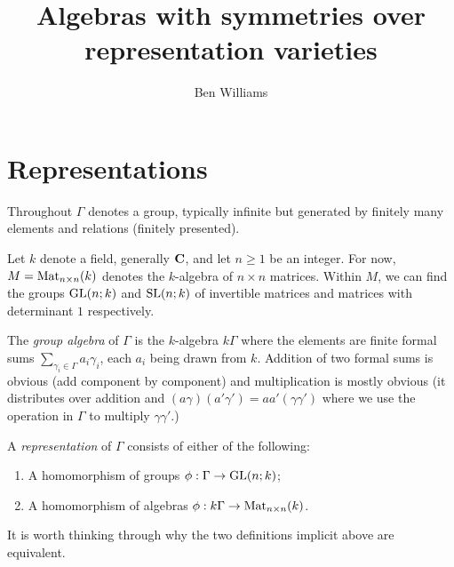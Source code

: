 \documentclass[11pt, oneside, usenames, dvipsnames, svgnames, table, draft]{amsart}
\begin{document}
   

\title{Algebras with symmetries over representation varieties}
\author{Ben Williams} %
\address{Department of Mathematics, University of British Columbia, Vancouver~BC V6T~1Z2, Canada}





\maketitle



\section{Representations} \label{sec:Introduction} 

Throughout $\Gamma$ denotes a group, typically infinite but generated by finitely many elements and relations (finitely
presented).

Let $k$ denote a field, generally $\mathbf{C}$, and let $n \ge 1$ be an integer. For now, $M=\operatorname{Mat}_{n \times n}(k)$ denotes the
$k$-algebra of $n\times n$ matrices. Within $M$, we can find the groups $\operatorname{GL}(n;k)$ and $\operatorname{SL}(n;k)$ of invertible matrices
and matrices with determinant $1$ respectively.

The \emph{group algebra} of $\Gamma$ is the $k$-algebra $k\Gamma$ where the elements are finite formal sums
$\sum_{\gamma_i \in \Gamma} a_i\gamma_i$, each $a_i$ being drawn from $k$. Addition of two formal sums is obvious (add
component by component) and multiplication is mostly obvious (it distributes over addition and $(a\gamma)(a' \gamma') =
aa' (\gamma \gamma')$ where we use the operation in $\Gamma$ to multiply $\gamma \gamma'$.)

A \emph{representation} of $\Gamma$ consists of either of the following:
\begin{enumerate}
\item A homomorphism of groups $\phi : \Gamma \to \operatorname{GL}(n;k)$;
\item A homomorphism of algebras $\phi: k\Gamma \to \operatorname{Mat}_{n \times n}(k)$.
\end{enumerate}
It is worth thinking through why the two definitions implicit above are equivalent.
\end{document}
